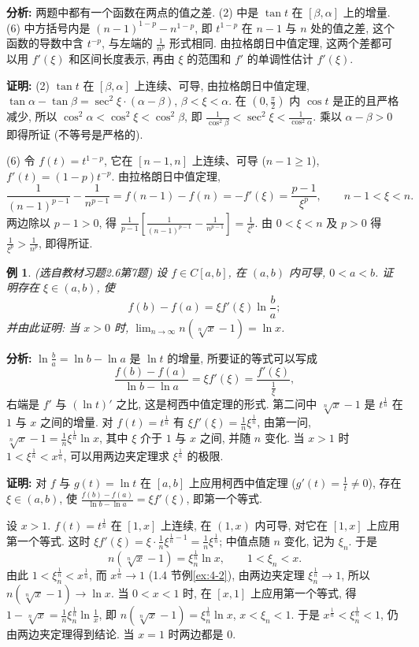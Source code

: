 \documentclass[UTF8,openany]{ctexbook}
\theoremstyle{chinesetextbook}
\newtheorem{example}{例}[section]
\newenvironment{cnproof}{\par\indent\textbf{证明:} \ignorespaces}{\par}
\begin{document}
\par\indent\textbf{分析:} 两题中都有一个函数在两点的值之差. (2) 中是 $\tan t$ 在 $[\beta,\alpha]$ 上的增量. (6) 中方括号内是 $(n-1)^{1-p}-n^{1-p}$, 即 $t^{1-p}$ 在 $n-1$ 与 $n$ 处的值之差, 这个函数的导数中含 $t^{-p}$, 与左端的 $\displaystyle\frac1{n^p}$ 形式相同. 由拉格朗日中值定理, 这两个差都可以用 $f'(\xi)$ 和区间长度表示, 再由 $\xi$ 的范围和 $f'$ 的单调性估计 $f'(\xi)$.
\begin{cnproof}
(2) $\tan t$ 在 $[\beta,\alpha]$ 上连续、可导, 由拉格朗日中值定理, $\tan\alpha-\tan\beta=\sec^2\xi\cdot(\alpha-\beta)$, $\beta<\xi<\alpha$. 在 $\displaystyle\left(0,\frac\pi2\right)$ 内 $\cos t$ 是正的且严格减少, 所以 $\cos^2\alpha<\cos^2\xi<\cos^2\beta$, 即 $\displaystyle\frac1{\cos^2\beta}<\sec^2\xi<\frac1{\cos^2\alpha}$. 乘以 $\alpha-\beta>0$ 即得所证 (不等号是严格的).

(6) 令 $f(t)=t^{1-p}$, 它在 $[n-1,n]$ 上连续、可导 ($n-1\ge1$), $f'(t)=(1-p)t^{-p}$. 由拉格朗日中值定理,
\[
\frac1{(n-1)^{p-1}}-\frac1{n^{p-1}}=f(n-1)-f(n)=-f'(\xi)=\frac{p-1}{\xi^p},\qquad n-1<\xi<n.
\]
两边除以 $p-1>0$, 得 $\displaystyle\frac1{p-1}\left[\frac1{(n-1)^{p-1}}-\frac1{n^{p-1}}\right]=\frac1{\xi^p}$. 由 $0<\xi<n$ 及 $p>0$ 得 $\displaystyle\frac1{\xi^p}>\frac1{n^p}$, 即得所证.
\end{cnproof}
\begin{example}\label{ex:c2-h6-7}
\textnormal{(选自教材习题2.6第7题)} 设 $f\in C[a,b]$, 在 $(a,b)$ 内可导, $0<a<b$. 证明存在 $\xi\in(a,b)$, 使
\[
f(b)-f(a)=\xi f'(\xi)\ln\frac ba;
\]
并由此证明: 当 $x>0$ 时, $\displaystyle\lim_{n\to\infty}n\left(\sqrt[n]x-1\right)=\ln x$.
\end{example}
\par\indent\textbf{分析:} $\displaystyle\ln\frac ba=\ln b-\ln a$ 是 $\ln t$ 的增量, 所要证的等式可以写成
\[
\frac{f(b)-f(a)}{\ln b-\ln a}=\xi f'(\xi)=\frac{f'(\xi)}{\frac1\xi},
\]
右端是 $f'$ 与 $(\ln t)'$ 之比, 这是柯西中值定理的形式. 第二问中 $\sqrt[n]x-1$ 是 $t^{\frac1n}$ 在 $1$ 与 $x$ 之间的增量. 对 $f(t)=t^{\frac1n}$ 有 $\displaystyle\xi f'(\xi)=\frac1n\xi^{\frac1n}$, 由第一问, $\displaystyle\sqrt[n]x-1=\frac1n\xi^{\frac1n}\ln x$, 其中 $\xi$ 介于 $1$ 与 $x$ 之间, 并随 $n$ 变化. 当 $x>1$ 时 $1<\xi^{\frac1n}<x^{\frac1n}$, 可以用两边夹定理求 $\xi^{\frac1n}$ 的极限.
\begin{cnproof}
对 $f$ 与 $g(t)=\ln t$ 在 $[a,b]$ 上应用柯西中值定理 ($\displaystyle g'(t)=\frac1t\ne0$), 存在 $\xi\in(a,b)$, 使 $\displaystyle\frac{f(b)-f(a)}{\ln b-\ln a}=\xi f'(\xi)$, 即第一个等式.

设 $x>1$. $f(t)=t^{\frac1n}$ 在 $[1,x]$ 上连续, 在 $(1,x)$ 内可导, 对它在 $[1,x]$ 上应用第一个等式. 这时 $\displaystyle\xi f'(\xi)=\xi\cdot\frac1n\xi^{\frac1n-1}=\frac1n\xi^{\frac1n}$; 中值点随 $n$ 变化, 记为 $\xi_n$. 于是
\[
n\left(\sqrt[n]x-1\right)=\xi_n^{\frac1n}\ln x,\qquad1<\xi_n<x.
\]
由此 $1<\xi_n^{\frac1n}<x^{\frac1n}$, 而 $x^{\frac1n}\to1$ (1.4 节例\ref{ex:4-2}), 由两边夹定理 $\xi_n^{\frac1n}\to1$, 所以 $n\left(\sqrt[n]x-1\right)\to\ln x$. 当 $0<x<1$ 时, 在 $[x,1]$ 上应用第一个等式, 得 $\displaystyle1-\sqrt[n]x=\frac1n\xi_n^{\frac1n}\ln\frac1x$, 即 $n\left(\sqrt[n]x-1\right)=\xi_n^{\frac1n}\ln x$, $x<\xi_n<1$. 于是 $x^{\frac1n}<\xi_n^{\frac1n}<1$, 仍由两边夹定理得到结论. 当 $x=1$ 时两边都是 $0$.
\end{cnproof}
\end{document}
